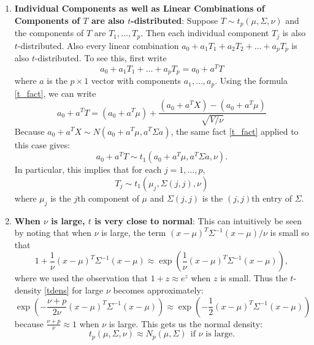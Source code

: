 \documentclass{scrartcl}
\begin{document}
\begin{enumerate}
\item \textbf{Individual Components as well as Linear Combinations of
    Components of $T$ are also $t$-distributed}: Suppose $T \sim
  t_p(\mu, \Sigma, \nu)$ and the components of $T$ are $T_1, \dots,
  T_p$. Then each individual component $T_j$ is also
  $t$-distributed. Also every linear combination $a_0 + a_1 T_1 + a_2
  T_2 +  \dots + a_p T_p$ is also $t$-distributed. To see this, first
  write
  \begin{equation*}
    a_0 + a_1 T_1 + \dots + a_p T_p = a_0 + a^T T 
  \end{equation*}
  where $a$ is the $p \times 1$ vector with components $a_1, \dots,
  a_p$. Using the formula \eqref{t_fact}, we can write
  \begin{equation*}
    a_0 + a^T T = (a_0 + a^T \mu) + \frac{(a_0 + a^TX) - (a_0 +
      a^T\mu)}{\sqrt{V/\nu}} 
  \end{equation*}
  Because $a_0 + a^T X \sim N(a_0 + a^T \mu, a^T \Sigma a)$, the same
  fact \eqref{t_fact} applied to this case gives:
  \begin{equation*}
    a_0 + a^T T \sim t_1(a_0 + a^T \mu, a^T \Sigma a, \nu). 
  \end{equation*}
  In particular, this implies that for each $j = 1, \dots, p$,
  \begin{equation*}
    T_j \sim t_1(\mu_j, \Sigma(j, j), \nu)
  \end{equation*}
  where $\mu_j$ is the $j$th component of $\mu$ and $\Sigma(j, j)$ is
  the $(j, j)$th entry of $\Sigma$. 
 \item \textbf{When $\nu$ is large, $t$ is very close to normal}:
   This can intuitively be seen by noting that when $\nu$ is
large, the term $(x - \mu)^T \Sigma^{-1} (x - \mu)/\nu$ is small so
that
\begin{equation*}
1 + \frac{1}{\nu}  (x - \mu)^T \Sigma^{-1} (x - \mu) \approx \exp
\left(\frac{1}{\nu}  (x - \mu)^T \Sigma^{-1} (x - \mu) \right), 
\end{equation*}
where we used the observation that $1 + z \approx e^z$ when $z$
is small. Thus the $t$-density \eqref{tdens} for large $\nu$ becomes
approximately:
\begin{equation*}
  \exp \left(-\frac{\nu + p}{2 \nu} (x - \mu)^T \Sigma^{-1} (x - \mu)
  \right) \approx \exp \left(-\frac{1}{2} (x - \mu)^T
    \Sigma^{-1} (x - \mu) \right) 
\end{equation*}
because $\frac{\nu + p}{\nu} \approx 1$ when $\nu$ is large. This gets
us the normal density:
\begin{equation*}
  t_{p}(\mu, \Sigma, \nu) \approx N_p(\mu, \Sigma) ~~\text{if $\nu$ is
    large}. 
\end{equation*}
\end{enumerate}
\end{document}
